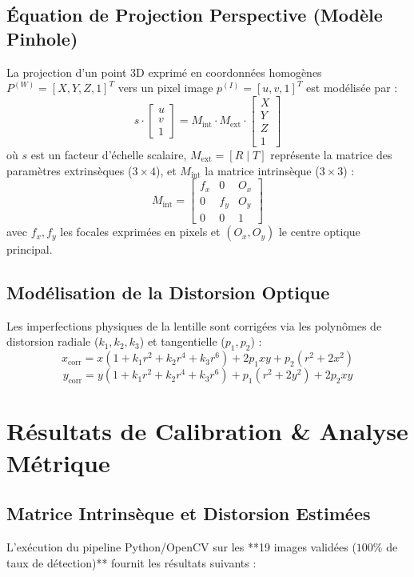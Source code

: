 \documentclass[11pt,a4paper]{article}
\begin{document}
\subsection{Équation de Projection Perspective (Modèle Pinhole)}
La projection d'un point 3D exprimé en coordonnées homogènes $P^{(W)} = [X, Y, Z, 1]^T$ vers un pixel image $p^{(I)} = [u, v, 1]^T$ est modélisée par :
\[
s \cdot \begin{bmatrix} u \\ v \\ 1 \end{bmatrix} = M_{\text{int}} \cdot M_{\text{ext}} \cdot \begin{bmatrix} X \\ Y \\ Z \\ 1 \end{bmatrix}
\]
où $s$ est un facteur d'échelle scalaire, $M_{\text{ext}} = [R \mid T]$ représente la matrice des paramètres extrinsèques ($3 \times 4$), et $M_{\text{int}}$ la matrice intrinsèque ($3 \times 3$) :
\[
M_{\text{int}} = \begin{bmatrix} f_x & 0 & O_x \\ 0 & f_y & O_y \\ 0 & 0 & 1 \end{bmatrix}
\]
avec $f_x, f_y$ les focales exprimées en pixels et $(O_x, O_y)$ le centre optique principal.

\subsection{Modélisation de la Distorsion Optique}
Les imperfections physiques de la lentille sont corrigées via les polynômes de distorsion radiale ($k_1, k_2, k_3$) et tangentielle ($p_1, p_2$) :
\[
x_{\text{corr}} = x (1 + k_1 r^2 + k_2 r^4 + k_3 r^6) + 2 p_1 x y + p_2 (r^2 + 2 x^2)
\]
\[
y_{\text{corr}} = y (1 + k_1 r^2 + k_2 r^4 + k_3 r^6) + p_1 (r^2 + 2 y^2) + 2 p_2 x y
\]

\section{Résultats de Calibration \& Analyse Métrique}

\subsection{Matrice Intrinsèque et Distorsion Estimées}
L'exécution du pipeline Python/OpenCV sur les **19 images validées ($100\%$ de taux de détection)** fournit les résultats suivants :
\end{document}
